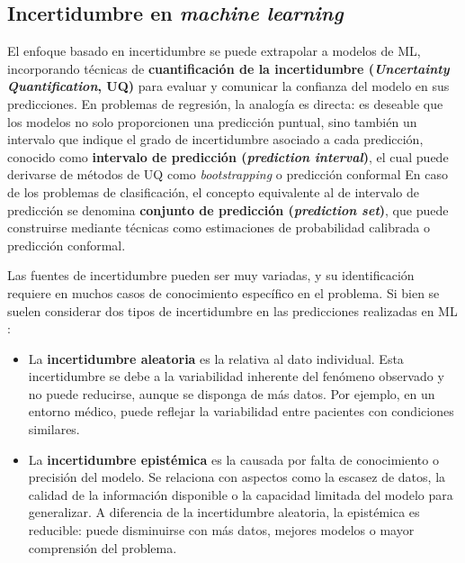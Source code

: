 \subsection{Incertidumbre en \textit{machine learning}}

El enfoque basado en incertidumbre se puede extrapolar a modelos de ML, incorporando técnicas de 
\textbf{cuantificación de la incertidumbre (\textit{Uncertainty Quantification}, UQ)} para evaluar y comunicar 
la confianza del modelo en sus predicciones. 
En problemas de regresión, la analogía es directa: es deseable que los modelos no solo proporcionen una 
predicción puntual, sino también un intervalo que indique el grado de incertidumbre asociado a cada 
predicción, conocido como \textbf{intervalo de predicción (\textit{prediction interval})},
el cual puede derivarse de métodos de UQ como \textit{bootstrapping} o predicción conformal
En caso de los problemas de clasificación, el concepto equivalente
al de intervalo de predicción se denomina \textbf{conjunto de predicción (\textit{prediction set})}, 
que puede construirse mediante técnicas como estimaciones de probabilidad calibrada o predicción conformal.  

Las fuentes de incertidumbre pueden ser muy variadas, y su identificación requiere en muchos casos de 
conocimiento específico en el problema. Si bien se suelen considerar dos tipos de incertidumbre en las 
predicciones realizadas en ML \cite{hullermeier2021}:

\begin{itemize}
    
    \item La \textbf{incertidumbre aleatoria} es la relativa al dato individual. 
    Esta incertidumbre se debe a la variabilidad inherente del fenómeno observado y no puede reducirse, aunque 
    se disponga de más datos. Por ejemplo, en un entorno médico, puede reflejar la variabilidad entre 
    pacientes con condiciones similares.

    \item La \textbf{incertidumbre epistémica} es la causada por falta de conocimiento o precisión del modelo.
    Se relaciona con aspectos como la escasez de datos, la calidad de la información disponible o la capacidad 
    limitada del modelo para generalizar. A diferencia de la incertidumbre aleatoria, la epistémica es 
    reducible: puede disminuirse con más datos, mejores modelos o mayor comprensión del problema.
    
\end{itemize}

